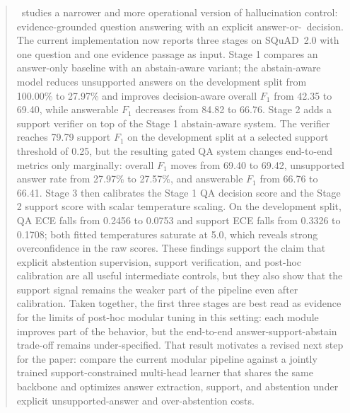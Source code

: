 \begin{abstract}
\system\ studies a narrower and more operational version of hallucination control:
evidence-grounded question answering with an explicit answer-or-\abstain\
decision.
The current implementation now reports three stages on SQuAD~2.0 with one
question and one evidence passage as input.
Stage 1 compares an answer-only baseline with an abstain-aware variant; the
abstain-aware model reduces unsupported answers on the development split from
100.00\% to 27.97\% and improves decision-aware overall $F_1$ from 42.35 to
69.40, while answerable $F_1$ decreases from 84.82 to 66.76.
Stage 2 adds a support verifier on top of the Stage 1 abstain-aware system.
The verifier reaches 79.79 support $F_1$ on the development split at a selected
support threshold of 0.25, but the resulting gated QA system changes end-to-end
metrics only marginally: overall $F_1$ moves from 69.40 to 69.42, unsupported
answer rate from 27.97\% to 27.57\%, and answerable $F_1$ from 66.76 to 66.41.
Stage 3 then calibrates the Stage 1 QA decision score and the Stage 2 support
score with scalar temperature scaling.
On the development split, QA ECE falls from 0.2456 to 0.0753 and support ECE
falls from 0.3326 to 0.1708; both fitted temperatures saturate at 5.0, which
reveals strong overconfidence in the raw scores.
These findings support the claim that explicit abstention supervision, support
verification, and post-hoc calibration are all useful intermediate controls,
but they also show that the support signal remains the weaker part of the
pipeline even after calibration.
Taken together, the first three stages are best read as evidence for the
limits of post-hoc modular tuning in this setting:
each module improves part of the behavior, but the end-to-end
answer-support-abstain trade-off remains under-specified.
That result motivates a revised next step for the paper:
compare the current modular pipeline against a jointly trained
support-constrained multi-head learner that shares the same backbone and
optimizes answer extraction, support, and abstention under explicit
unsupported-answer and over-abstention costs.
\end{abstract}
